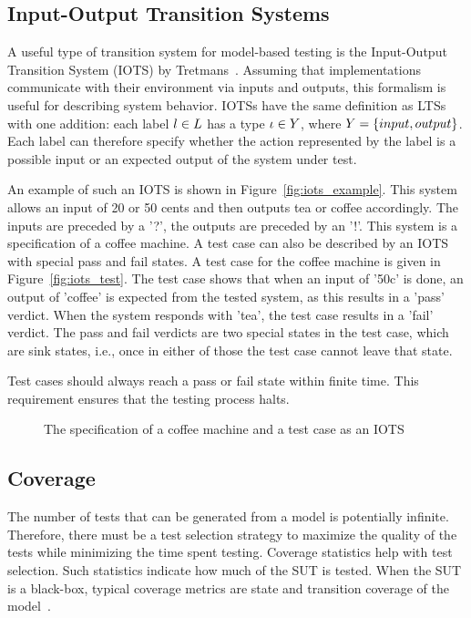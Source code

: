 \subsection{Input-Output Transition Systems}
A useful type of transition system for model-based testing is the Input-Output Transition System (IOTS) by Tretmans~\cite{Tretmans:testgeneration}. Assuming that implementations communicate with their environment via inputs and outputs, this formalism is useful for describing system behavior. IOTSs have the same definition as LTSs with one addition: each label $l \in L$ has a type $\iota \in Y$, where $Y = \{input, output\}$. Each label can therefore specify whether the action represented by the label is a possible input or an expected output of the system under test.

An example of such an IOTS is shown in Figure~\ref{fig:iots_example}. This system allows an input of 20 or 50 cents and then outputs tea or coffee accordingly. The inputs are preceded by a '?', the outputs are preceded by an '!'. This system is a specification of a coffee machine. A test case can also be described by an IOTS with special pass and fail states. A test case for the coffee machine is given in Figure~\ref{fig:iots_test}. The test case shows that when an input of '50c' is done, an output of 'coffee' is expected from the tested system, as this results in a 'pass' verdict. When the system responds with 'tea', the test case results in a 'fail' verdict. The pass and fail verdicts are two special states in the test case, which are sink states, i.e., once in either of those the test case cannot leave that state. 

Test cases should always reach a pass or fail state within finite time. This requirement ensures that the testing process halts.
\begin{figure}[ht]
  \begin{center}
    \subfloat[An IOTS]{\label{fig:iots_example}}
  \end{center}
  \caption{The specification of a coffee machine and a test case as an IOTS}
\end{figure}

\subsection{Coverage}\label{sec:coverage}
The number of tests that can be generated from a model is potentially infinite. Therefore, there must be a test selection strategy to maximize the quality of the tests while minimizing the time spent testing. Coverage statistics help with test selection. Such statistics indicate how much of the SUT is tested. When the SUT is a black-box, typical coverage metrics are state and transition coverage of the model~\cite{Lee:testing, Nachmanson:testing, Hasan:testing}.

